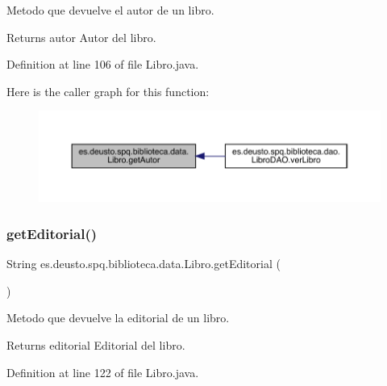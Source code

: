 Metodo que devuelve el autor de un libro. \begin{DoxyReturn}{Returns}
autor Autor del libro. 
\end{DoxyReturn}


Definition at line 106 of file Libro.\+java.

Here is the caller graph for this function\+:
\nopagebreak
\begin{figure}[H]
\begin{center}
\leavevmode
\includegraphics[width=350pt]{classes_1_1deusto_1_1spq_1_1biblioteca_1_1data_1_1_libro_ae42d9e4ed794f598f4d05dcdb7c307d5_icgraph}
\end{center}
\end{figure}
\mbox{\label{classes_1_1deusto_1_1spq_1_1biblioteca_1_1data_1_1_libro_a246aede47ebda75d4ea896995573ab5b}} 
\subsubsection{\texorpdfstring{get\+Editorial()}{getEditorial()}}
{\footnotesize\ttfamily String es.\+deusto.\+spq.\+biblioteca.\+data.\+Libro.\+get\+Editorial (\begin{DoxyParamCaption}{ }\end{DoxyParamCaption})}

Metodo que devuelve la editorial de un libro. \begin{DoxyReturn}{Returns}
editorial Editorial del libro. 
\end{DoxyReturn}


Definition at line 122 of file Libro.\+java.


